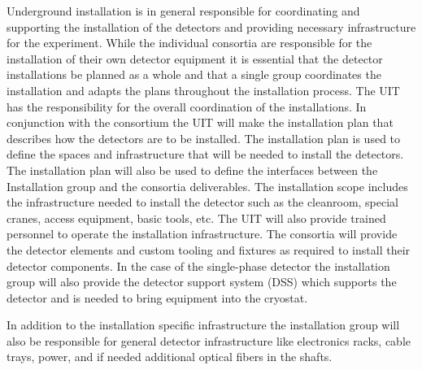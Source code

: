 Underground installation is in general responsible for coordinating and supporting the installation of
the detectors and providing necessary infrastructure for the experiment. While the individual consortia are responsible for the installation of their own detector equipment it is essential that the detector installations be planned as a whole and that a single group coordinates the installation and adapts the plans throughout the installation process. The UIT has the responsibility for the overall coordination of the installations. In conjunction with the consortium the UIT will make the installation plan that describes how the detectors are to be installed. The installation plan is used to define the spaces and infrastructure that will be needed to install the detectors. The installation plan will also be used to define the interfaces between the Installation group and the consortia deliverables.  The installation scope includes the
infrastructure needed to install the detector such as the cleanroom,
special cranes, access equipment, basic tools, etc. The UIT will also provide
trained personnel to operate the installation infrastructure. The
consortia will provide the detector elements and custom tooling and
fixtures as required to install their detector components. In the case of the single-phase detector the installation group will
also provide the detector support system (DSS) which supports the detector and is needed to bring equipment
into the cryostat.

In addition to the installation specific infrastructure the installation group will also be responsible for general detector
infrastructure like electronics racks, cable trays, power, and if needed
additional optical fibers in the shafts.

 







